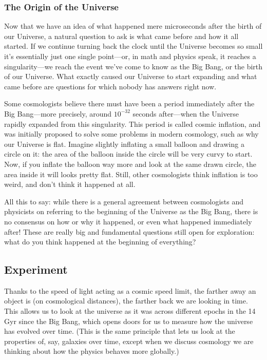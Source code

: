 \subsubsection{The Origin of the Universe}

Now that we have an idea of what happened mere microseconds after the birth of our Universe, a natural question to ask is what came before and how it all started. If we continue turning back the clock until the Universe becomes so small it's essentially just one single point---or, in math and physics speak, it reaches a singularity---we reach the event we've come to know as the Big Bang, or the birth of our Universe. What exactly caused our Universe to start expanding and what came before are questions for which nobody has answers right now. 

Some cosmologists believe there must have been a period immediately after the Big Bang---more precisely, around $10^{-32}$ seconds after---when the Universe rapidly expanded from this singularity. This period is called cosmic inflation, and was initially proposed to solve some problems in modern cosmology, such as why our Universe is flat. Imagine slightly inflating a small balloon and drawing a circle on it: the area of the balloon inside the circle will be very curvy to start. Now, if you inflate the balloon way more and look at the same drawn circle, the area inside it will looks pretty flat. Still, other cosmologists think inflation is too weird, and don't think it happened at all. 

All this to say: while there is a general agreement between cosmologists and physicists on referring to the beginning of the Universe as the Big Bang, there is no consensus on how or why it happened, or even what happened immediately after! These are really big and fundamental questions still open for exploration: what do you think happened at the beginning of everything?

\subsection{Experiment}

Thanks to the speed of light acting as a cosmic speed limit, the farther away an object is (on cosmological distances), the farther back we are looking in time. This allows us to look at the universe as it was across different epochs in the 14 Gyr since the Big Bang, which opens doors for us to measure how the universe has evolved over time. (This is the same principle that lets us look at the properties of, say, galaxies over time, except when we discuss cosmology we are thinking about how the physics behaves more globally.)

